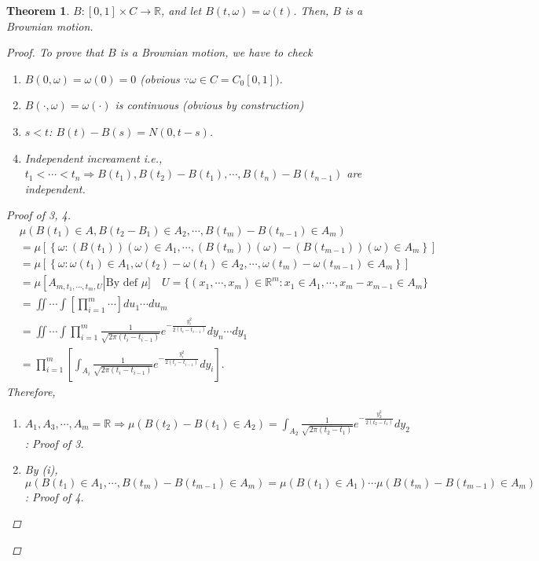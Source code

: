 \documentclass[12pt]{report}
\newcommand{\R}{\mathbb{R}}
\renewcommand{\1}{\mathbb{1}}
\theoremstyle{break}
\newtheorem{thm}{Theorem}[section] %
\theoremstyle{newdef}
\theoremstyle{remark}
\begin{document}
\begin{thm}
$B: [0,1] \times C \rightarrow \R$, and let $B(t,\omega) = \omega(t)$.
Then, $B$ is a Brownian motion.

\begin{proof}
To prove that $B$ is a Brownian motion, we have to check
\begin{enumerate}
\item $B(0,\omega) = \omega(0) = 0$ (obvious $ \because \omega \in C = C_0[0,1])$.
\item $B(\cdot, \omega) = \omega(\cdot)$ is continuous (obvious by construction)
\item $s < t$: $B(t) - B(s) = N(0,t-s)$.
\item Independent increament i.e., $t_1 < \cdots < t_n \Rightarrow B(t_1), B(t_2) - B(t_1), \cdots, B(t_n) - B(t_{n-1})$ are independent.
\end{enumerate}

\begin{proof}[Proof of 3, 4]
$$
\begin{aligned}
&\mu\left(B(t_1) \in A, B(t_2 - B_1) \in A_2, \cdots, B(t_m) - B(t_{n-1}) \in A_m\right)\\
&= \mu \left[ \left\{\omega: (B(t_1))(\omega) \in A_1, \cdots, (B(t_m))(\omega) - (B(t_{m-1}))(\omega) \in A_m \right\}\right]\\
&= \mu\left[ \left\{ \omega : \omega(t_1) \in A_1, \omega(t_2) - \omega(t_1) \in A_2, \cdots, \omega(t_m) - \omega(t_{m-1}) \in A_m \right\}\right]\\
&= \mu\left[ A_{m,t_1,\cdots,t_m, U}\right | \text{By def } \mu] \quad U = \{(x_1, \cdots, x_m) \in \R^m : x_1 \in A_1, \cdots, x_m- x_{m-1} \in A_m\}\\
&= \iint\cdots\int \left[\prod_{i=1}^{m} \cdots \right] du_1 \cdots du_m\\
&= \iint\cdots\int \prod_{i=1}^m \frac{1}{\sqrt{2\pi(t_i-t_{i-1})}} e^{-\frac{y_i^2}{2(t_i-t_{i-1})}} dy_n\cdots dy_1\\
&= \prod_{i=1}^m \left[\int_{A_i} \frac{1}{\sqrt{2\pi(t_i-t_{i-1})}} e^{-\frac{y_i^2}{2(t_i-t_{i-1})}}dy_i\right].
\end{aligned}
$$
Therefore,
\begin{enumerate}[label = (\roman*)]
\item $A_1, A_3, \cdots, A_m = \R \Rightarrow \mu(B(t_2) - B(t_1) \in A_2) = \int_{A_2} \frac{1}{\sqrt{2\pi(t_2-t_{1})}} e^{-\frac{y_2^2}{2(t_2-t_1)}}dy_2$: Proof of 3.
\item By (i), $\mu(B(t_1) \in A_1, \cdots, B(t_m) - B(t_{m-1}) \in A_m ) = \mu(B(t_1) \in A_1) \cdots \mu(B(t_m) - B(t_{m-1}) \in A_m)$: Proof of 4.
\end{enumerate}
\end{proof}


\end{proof}
\end{thm}
\end{document}
